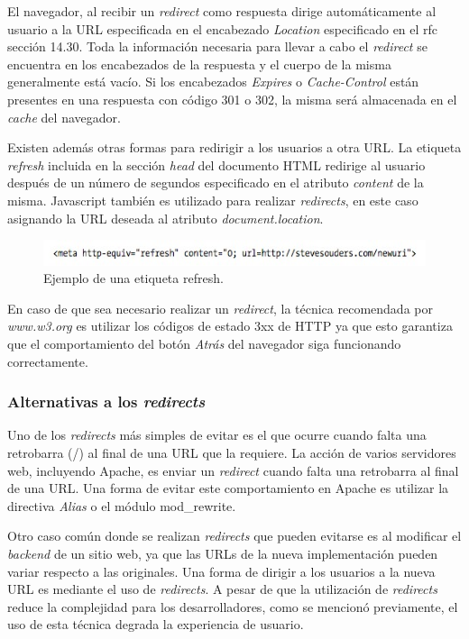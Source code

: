 El navegador, al recibir un \emph{redirect} como respuesta dirige automáticamente al usuario a la URL especificada en el encabezado \emph{Location}
especificado en el rfc \cite{rfc2616} sección 14.30. Toda la información necesaria para llevar a cabo el \emph{redirect} se encuentra en los encabezados de la respuesta
y el cuerpo de la misma generalmente está vacío. Si los encabezados \emph{Expires}
o \emph{Cache-Control} están presentes en una respuesta con código 301 o 302, la misma será almacenada en el \emph{cache} del navegador.

Existen además otras formas para redirigir a los usuarios a otra URL. La etiqueta \emph{refresh}
incluida en la sección \emph{head} del documento HTML redirige al usuario después de un número de
segundos especificado en el atributo \emph{content} de la misma.
Javascript también es utilizado para realizar \emph{redirects}, en este caso asignando la URL deseada al atributo \emph{document.location}.

\begin{figure}[h!]
\centering
\includegraphics[scale=0.5]{figuras/hpws/meta-refresh.jpg}
	\caption{Ejemplo de una etiqueta refresh.}
    \label{fig.redirect}
\end{figure}

En caso de que sea necesario realizar un \emph{redirect}, la técnica recomendada por \emph{www.w3.org} es utilizar los códigos de estado 3xx de HTTP ya que esto garantiza que el
comportamiento del botón \emph{Atrás} del navegador siga funcionando correctamente.

\subsubsection{Alternativas a los \emph{redirects}}

Uno de los \emph{redirects} más simples de evitar es el que ocurre cuando falta una retrobarra (/) al final de una URL que la requiere. La acción de varios servidores web,
incluyendo Apache, es enviar un \emph{redirect} cuando falta una retrobarra al final de una URL. Una forma de evitar este comportamiento en Apache es utilizar la directiva
\emph{Alias} o el módulo mod\_rewrite.

Otro caso común donde se realizan \emph{redirects} que pueden evitarse es al modificar el \emph{backend}
de un sitio web, ya que las URLs de la nueva implementación pueden variar respecto a las originales. Una
forma de dirigir a los usuarios a la nueva URL es mediante el uso de \emph{redirects}.
A pesar de que la utilización de \emph{redirects} reduce la complejidad para los desarrolladores, como
se mencionó previamente, el uso de esta técnica degrada la experiencia de usuario.

